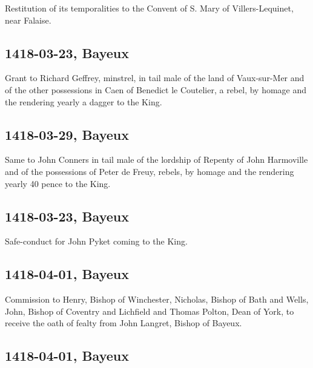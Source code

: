 \documentclass[a4paper,12pt,twoside]{book}
\begin{document}
                  Restitution of its temporalities to the Convent of S. Mary of Villers-Lequinet, near Falaise.
               
            \subsection{1418-03-23, Bayeux}
            
                  Grant to Richard Geffrey, minstrel, in tail male of the land of Vaux-sur-Mer and of the other possessions in Caen of Benedict le Coutelier, a rebel, by homage and the rendering yearly a dagger to the King.
               
            \subsection{1418-03-29, Bayeux}
            
                  Same to John Conners in tail male of the lordship of Repenty of John Harmoville and of the possessions of Peter de Freuy, rebels, by homage and the rendering yearly 40 pence to the King.
               
            \subsection{1418-03-23, Bayeux}
            
                  Safe-conduct for John Pyket coming to the King.
               
            \subsection{1418-04-01, Bayeux}
            
                  Commission to Henry, Bishop of Winchester, Nicholas, Bishop of Bath and Wells, John, Bishop of Coventry and Lichfield and Thomas Polton, Dean of York, to receive the oath of fealty from John Langret, Bishop of Bayeux.
               
            \subsection{1418-04-01, Bayeux}
            
\end{document}
